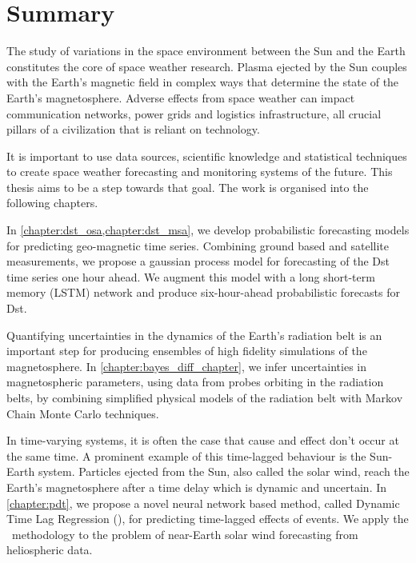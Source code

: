 \chapter*{Summary}\label{chapter:abstract}

\begin{center}

    \textbf{\doctitle}

    \textit{\docsubtitle}


\end{center}

The study of variations in the space environment between the Sun and the Earth 
constitutes the core of space weather research. Plasma ejected by the 
Sun couples with the Earth’s magnetic field in complex ways that determine 
the state of the Earth's magnetosphere. Adverse effects from space weather can 
impact communication networks, power grids and logistics infrastructure, all 
crucial pillars of a civilization that is reliant on technology.

It is important to use data sources, scientific knowledge and statistical 
techniques to create space weather forecasting and monitoring systems of the 
future. This thesis aims to be a step towards that goal. The work is organised 
into the following chapters.

In \cref{chapter:dst_osa,chapter:dst_msa}, we develop probabilistic forecasting 
models for predicting geo-magnetic time series. Combining ground based and 
satellite measurements, we propose a gaussian process model for forecasting of 
the Dst time series one hour ahead. We augment this model with a 
long short-term memory (LSTM) network and produce six-hour-ahead probabilistic 
forecasts for Dst.

Quantifying uncertainties in the dynamics of the Earth's radiation belt is an 
important step for producing ensembles of high fidelity simulations of the 
magnetosphere. In \cref{chapter:bayes_diff_chapter}, we infer uncertainties in 
magnetospheric parameters, using data from probes orbiting in the radiation 
belts, by combining simplified physical models of the radiation belt with 
Markov Chain Monte Carlo techniques.

In time-varying systems, it is often the case that cause and effect don't occur
at the same time. A prominent example of this time-lagged behaviour is the 
Sun-Earth system. Particles ejected from the Sun, also called the solar wind, 
reach the Earth's magnetosphere after a time delay which is dynamic and 
uncertain. In \cref{chapter:pdt}, we propose a novel neural network based 
method, called Dynamic Time Lag Regression (\XX), for predicting time-lagged 
effects of events. We apply the \XX \ methodology to the problem of near-Earth 
solar wind forecasting from heliospheric data.
